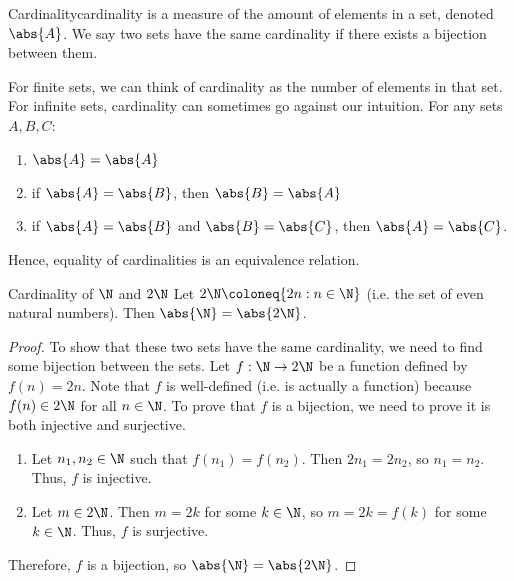 \begin{dfnbox}{Cardinality}{cardinality}
     is a measure of the amount of elements in a set, denoted $\abs{A}$. We say two sets have the same cardinality if there exists a bijection between them.
\end{dfnbox}

For finite sets, we can think of cardinality as the number of elements in that set. For infinite sets, cardinality can sometimes go against our intuition.     For any sets $A,B,C$:
\begin{enumerate}[noitemsep]
    \item $\abs{A} = \abs{A}$
    \item if $\abs{A} = \abs{B}$, then $\abs{B} = \abs{A}$
    \item if $\abs{A} = \abs{B}$ and $\abs{B} = \abs{C}$, then $\abs{A} = \abs{C}$.
\end{enumerate}
Hence, equality of cardinalities is an equivalence relation.

\begin{exbox}{Cardinality of $\N$ and $2\N$}{}
    Let $2\N \coloneq \{ 2n : n \in \N \}$ (i.e. the set of even natural numbers). Then $\abs{\N} = \abs{2\N}$.
    \tcblower
    \begin{proof}
        To show that these two sets have the same cardinality, we need to find some bijection between the sets. Let $f : \N \to 2\N$ be a function defined by $f(n) = 2n$. Note that $f$ is well-defined (i.e. is actually a function) because $f(n) \in 2 \N$ for all $n \in \N$. To prove that $f$ is a bijection, we need to prove it is both injective and surjective.
        \begin{enumerate}
            \item Let $n_1, n_2 \in \N$ such that $f(n_1) = f(n_2)$. Then $2n_1 = 2n_2$, so $n_1 = n_2$. Thus, $f$ is injective.
            \item Let $m \in 2\N$. Then $m = 2k$ for some $k \in \N$, so $m = 2k = f(k)$ for some $k \in \N$. Thus, $f$ is surjective.
        \end{enumerate}
        Therefore, $f$ is a bijection, so $\abs{\N} = \abs{2\N}$.
    \end{proof}
\end{exbox}

